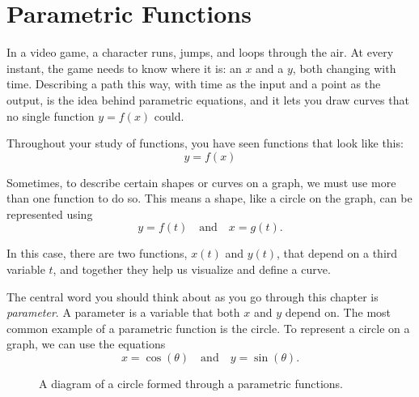\chapter{Parametric Functions}

In a video game, a character runs, jumps, and loops through the air. At
every instant, the game needs to know where it is: an $x$ and a $y$, both
changing with time. Describing a path this way, with time as the input and
a point as the output, is the idea behind parametric equations, and it
lets you draw curves that no single function $y = f(x)$ could.

Throughout your study of functions, you have seen functions that look like this:
\begin{equation*}
    y = f(x)
\end{equation*}

Sometimes, to describe certain shapes or curves on a graph, we must use more than one function to do so. This means a shape, like a circle on the graph, can be represented using
\begin{equation*}
    y = f(t) \quad \text{and} \quad x = g(t).
\end{equation*}

In this case, there are two functions, $x(t)$ and $y(t)$, that depend on a third variable $t$, and together they help us visualize and define a curve.

The central word you should think about as you go through this chapter is \emph{parameter}. A parameter is a variable that both $x$ and $y$ depend on. The most common example of a parametric function is the circle. To represent a circle on a graph, we can use the equations
\begin{equation*}
    x = \cos(\theta) \quad \text{and} \quad y = \sin(\theta).
\end{equation*}


\begin{figure}
    \centering
    \caption{A diagram of a circle formed through a parametric functions.}
    \label{fig:sin_cos}
\end{figure}


